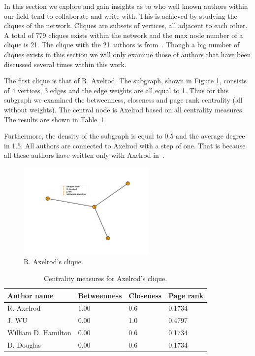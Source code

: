 \documentclass{article}
\begin{document}
In this section we explore and gain insights as to who well known authors within
our field tend to collaborate and write with. This is achieved by studying the
cliques of the network. Cliques are subsets of vertices, all adjacent to each other. 
A total of 779 cliques exists within the network and the max node number of a
clique is 21. The clique with the 21 authors is from~\cite{Knight2016}.
Though a big number of cliques exists in this section we will only examine those
of authors that have been discussed several times within this work.

The first clique is that of R. Axelrod. The subgraph, shown in Figure
\ref{fig:axelrods_clique}, consists of 4 vertices, 3 edges and the edge weights
are all equal to 1. Thus for this subgraph we examined the betweenness, closeness
and page rank centrality (all without weights). The central node is Axelrod 
based on all centrality measures. The results are shown in Table~\ref{table:axelrods_clique}.

Furthermore, the density of the subgraph is equal to 0.5 and the average degree
in 1.5. All authors are connected to Axelrod with a step of one. That is because
all these authors have written only with Axelrod in~\cite{Axelrod1988,
Axelrod1984, Wu1995}.

\begin{figure}[!hbtp]
    \centering
    \includegraphics[width=0.6\textwidth]{./assets/images/Axelrod.pdf}
    \caption{R. Axelrod's clique.}
    \label{fig:axelrods_clique}
\end{figure}

\begin{table}[!hbtp]
    \begin{center}
    \begin{tabular}{llll}
    \toprule
    Author name &  Betweenness & Closeness & Page rank \\
    \midrule
     R. Axelrod          &    1.00 & 0.6 & 0.1734 \\
     J. WU               &    0.00 & 1.0 & 0.4797 \\
     William D. Hamilton &    0.00 & 0.6 & 0.1734 \\
     D. Douglas          &    0.00 & 0.6 & 0.1734 \\
    \bottomrule
    \end{tabular}
    \caption{Centrality measures for Axelrod's clique.}
    \label{table:axelrods_clique}
    \end{center}
\end{table}
\end{document}
